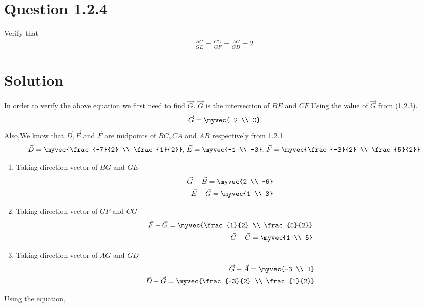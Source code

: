 \documentclass[journal,12pt,twocolumn]{IEEEtran}
\theoremstyle{remark}
\begin{document}
\section{Question 1.2.4}Verify that 
\begin{align}
		\frac{BG}{GE} = 
		\frac{CG}{GF} =
		\frac{AG}{GD} = 2 
\end{align}
\section{Solution}In order to verify the above equation we first need to find $\vec{G}$. 
$\vec{G}$ is the intersection of $BE$ and $CF$
Using the value of $\vec{G}$ from (1.2.3).
\begin{align}
		\vec{G} = \myvec{-2 \\ 0}
\end{align}
Also,We know that $\vec{D}, \vec{E}$ and $\vec{F}$ are midpoints of $BC, CA$ and $AB$ respectively from 1.2.1.
\begin{align}
		\vec{D} = \myvec{\frac{-7}{2} \\ \frac{1}{2}},\,
		\vec{E} = \myvec{-1 \\ -3},\,
		\vec{F} = \myvec{\frac{-3}{2} \\ \frac{5}{2}}
\end{align}
\begin{enumerate}
\item Taking direction vector of $BG$ and $GE$ 
\begin{align}
		\label{eq:tri-pts/4} \vec{G}-\vec{B} = \myvec{2 \\ -6} \\
		\label{eq:tri-pts/5} \vec{E}-\vec{G} = \myvec{1 \\ 3} \\
\end{align}		
\item Taking direction vector of $GF$ and $CG$
\begin{align}
		\label{eq:tri-pts/7} \vec{F}-\vec{G} = \myvec{\frac{1}{2} \\ \frac{5}{2}} \\
		\label{eq:tri-pts/8} \vec{G}-\vec{C} = \myvec{1 \\ 5} \\
\end{align}
\item Taking direction vector of $AG$ and $GD$
\begin{align}
		\label{eq:tri-pts/10} \vec{G}-\vec{A} = \myvec{-3 \\ 1} \\
		\label{eq:tri-pts/11} \vec{D}-\vec{G} = \myvec{\frac{-3}{2} \\ \frac{1}{2}}
\end{align}
\end{enumerate}
Using the equation,
 		
\end{document}
